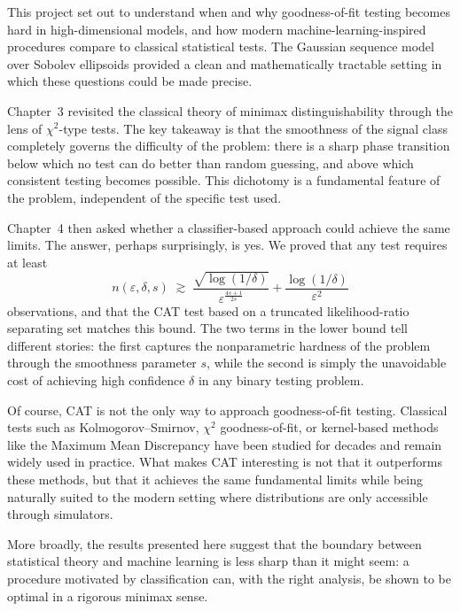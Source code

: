 
This project set out to understand when and why goodness-of-fit testing becomes hard in
high-dimensional models, and how modern machine-learning-inspired procedures compare to
classical statistical tests. The Gaussian sequence model over Sobolev ellipsoids provided
a clean and mathematically tractable setting in which these questions could be made precise.

Chapter~3 revisited the classical theory of minimax distinguishability through the lens of
$\chi^2$-type tests. The key takeaway is that the smoothness of the signal class completely
governs the difficulty of the problem: there is a sharp phase transition below which no
test can do better than random guessing, and above which consistent testing becomes
possible. This dichotomy is a fundamental feature of the problem, independent of the
specific test used.

Chapter~4 then asked whether a classifier-based approach could achieve the same limits.
The answer, perhaps surprisingly, is yes. We proved that any test requires at least
\[
    n(\varepsilon, \delta, s)
    \;\gtrsim\;
    \frac{\sqrt{\log(1/\delta)}}{\varepsilon^{\frac{4s+1}{2s}}}
    + \frac{\log(1/\delta)}{\varepsilon^{2}}
\]
observations, and that the CAT test based on a truncated likelihood-ratio separating set
matches this bound. The two terms in the lower bound tell different stories: the first
captures the nonparametric hardness of the problem through the smoothness parameter $s$,
while the second is simply the unavoidable cost of achieving high confidence $\delta$ in
any binary testing problem.

Of course, CAT is not the only way to approach goodness-of-fit testing. Classical tests
such as Kolmogorov--Smirnov, $\chi^2$ goodness-of-fit, or kernel-based methods like the
Maximum Mean Discrepancy have been studied for decades and remain widely used in practice.
What makes CAT interesting is not that it outperforms these methods, but that it achieves
the same fundamental limits while being naturally suited to the modern setting where
distributions are only accessible through simulators.

More broadly, the results presented here suggest that the boundary between statistical
theory and machine learning is less sharp than it might seem: a procedure motivated by
classification can, with the right analysis, be shown to be optimal in a rigorous
minimax sense.